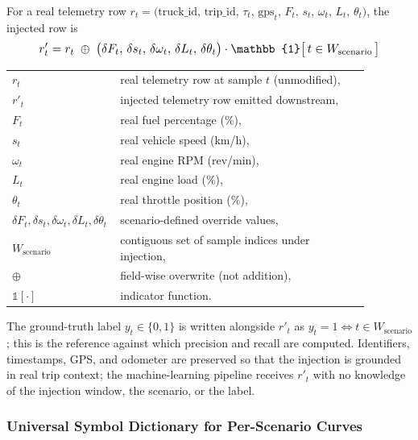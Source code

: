 For a real telemetry row $r_t = \bigl(\mathrm{truck\_id},\, \mathrm{trip\_id},\, \tau_t,\, \mathrm{gps}_t,\, F_t,\, s_t,\, \omega_t,\, L_t,\, \theta_t\bigr)$, the injected row is
\begin{equation}
\resizebox{0.88\linewidth}{!}{$\displaystyle
r'_t = r_t \;\oplus\; \bigl(\delta F_t,\, \delta s_t,\, \delta \omega_t,\, \delta L_t,\, \delta \theta_t\bigr) \cdot \mathbb{1}\bigl[\,t \in W_{\mathrm{scenario}}\,\bigr]
$}
\label{eq:injection_model}
\end{equation}
\noindent\begin{tabular}{@{}p{0.20\linewidth}@{\quad}p{0.68\linewidth}@{}}
$r_t$ & real telemetry row at sample $t$ (unmodified), \\
$r'_t$ & injected telemetry row emitted downstream, \\
$F_t$ & real fuel percentage (\%), \\
$s_t$ & real vehicle speed (km/h), \\
$\omega_t$ & real engine RPM (rev/min), \\
$L_t$ & real engine load (\%), \\
$\theta_t$ & real throttle position (\%), \\
$\delta F_t,\delta s_t,\delta \omega_t,\delta L_t,\delta \theta_t$ & scenario-defined override values, \\
$W_{\mathrm{scenario}}$ & contiguous set of sample indices under injection, \\
$\oplus$ & field-wise overwrite (not addition), \\
$\mathbb{1}[\cdot]$ & indicator function.
\end{tabular}

\vspace{0.5em}
The ground-truth label $y_t \in \{0, 1\}$ is written alongside $r'_t$ as $y_t = 1 \Leftrightarrow t \in W_{\mathrm{scenario}}$; this is the reference against which precision and recall are computed. Identifiers, timestamps, GPS, and odometer are preserved so that the injection is grounded in real trip context; the machine-learning pipeline receives $r'_t$ with no knowledge of the injection window, the scenario, or the label.

\subsubsection{Universal Symbol Dictionary for Per-Scenario Curves}

